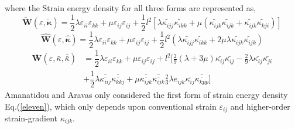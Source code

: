 \documentclass[12pt]{article}
\begin{document}
\newline
\newline
where the Strain energy density for all three forms are represented as,
\begin{equation}\label{eleven}
\tilde{\mathbf{W}}(\varepsilon,\tilde{\mathbf{\kappa}}) = \dfrac{1}{2}\lambda\varepsilon_{ii}\varepsilon_{kk} + \mu\varepsilon_{ij}\varepsilon_{ij}+\frac{1}{2}l^2[\lambda\tilde{\kappa_{ijj}}\tilde{\kappa_{ikk}} + \mu(\tilde{\kappa_{ijk}}\tilde{\kappa_{ijk}}+\tilde{\kappa_{ijk}}\tilde{\kappa_{kji}})]
\end{equation}
\begin{equation}
 \hat{\mathbf{W}}(\varepsilon,\hat{\mathbf{\kappa}}) = \dfrac{1}{2}\lambda\varepsilon_{ii}\varepsilon_{kk} + \mu\varepsilon_{ij}\varepsilon_{ij}+\frac{1}{2}l^2(\lambda\tilde{\kappa_{ijj}}\tilde{\kappa_{ikk}}+2\mu\lambda\tilde{\kappa_{ijk}}\tilde{\kappa_{ijk}})
\end{equation}
\begin{equation}
\begin{aligned}
\bar{\mathbf{W}}(\varepsilon,\bar{\kappa},\bar{\bar \kappa}) &= \dfrac{1}{2}\lambda\varepsilon_{ii}\varepsilon_{kk} + \mu\varepsilon_{ij}\varepsilon_{ij} +l^2 [\frac{2}{9}(\lambda+3\mu)\bar{\kappa_{ij}}\bar{\kappa_{ij}}-\frac{2}{9} \lambda \bar{\kappa_{ij}} \bar{\kappa_{ji}} \\
& + \dfrac{1}{2}\lambda \bar{\bar{\kappa_{iij}}} \bar{\bar {\kappa_{kkj}}} + \mu \bar{\bar{ \kappa_{ijk}}} \bar{\bar{ \kappa_{ijk}}} \frac{2}{3}\lambda e_{ijk}\bar{\kappa_{ij}}\bar{\bar {\kappa_{kpp}}}]
\end{aligned}
\end{equation}
\newline
\newline
Amanatidou and Aravas only considered the first form of strain energy density Eq.(\ref{eleven}), which only depends upon conventional strain $ \varepsilon_{ij} $ and higher-order strain-gradient $ \kappa_{ijk} $. 
\newline
\newline
\end{document}
